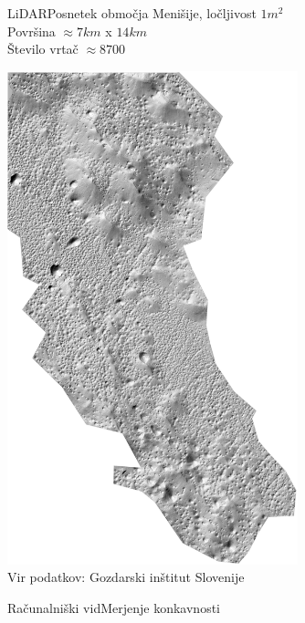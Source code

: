 \documentclass{beamer}
\begin{document}
\begin{frame}{LiDAR}{Posnetek območja Menišije, ločljivost $1m^2$ \\ Površina $\approx 7 km$ x $14 km$ \\ Število vrtač $\approx 8700$}
\begin{center}
  \hspace*{-0.79cm}\includegraphics[width=0.63\textwidth,angle=90]{slike/menisija-relief}
  \tiny{\\Vir podatkov: Gozdarski inštitut Slovenije}
\end{center}
\end{frame}

\begin{frame}{Računalniški vid}{Merjenje konkavnosti}

\end{frame}
\end{document}
